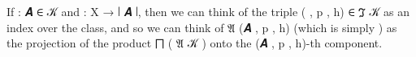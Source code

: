If  \as : \ab 𝑨 \af ∈ \ab 𝒦 and  \as : \ab X \as → \af ∣ \ab 𝑨 \af ∣, then we can think of the triple ( , \ab p , \ab h) \af ∈ \af ℑ \ab 𝒦 as an index over the class, and so we can think of \af 𝔄 (\ab 𝑨 , \ab p , \ab h) (which is simply ) as the projection of the product \af ⨅ ( \af 𝔄 \ab 𝒦 ) onto the (\ab 𝑨 , \ab p , \ab h)-th component.
